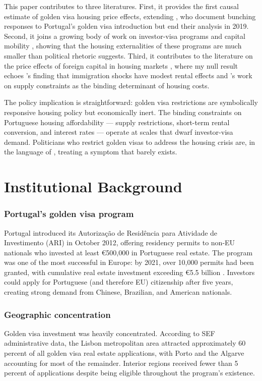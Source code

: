 \documentclass[12pt]{article}
\begin{document}
This paper contributes to three literatures. First, it provides the first causal estimate of golden visa housing price effects, extending \citet{dePereiraDosSantos2024}, who document bunching responses to Portugal's golden visa introduction but end their analysis in 2019. Second, it joins a growing body of work on investor-visa programs and capital mobility \citep{Xu2021, Surak2021}, showing that the housing externalities of these programs are much smaller than political rhetoric suggests. Third, it contributes to the literature on the price effects of foreign capital in housing markets \citep{Badarinza2017, Cvijanovic2022, Sá2017}, where my null result echoes \citet{Saiz2007}'s finding that immigration shocks have modest rental effects and \citet{Hilber2016}'s work on supply constraints as the binding determinant of housing costs.

The policy implication is straightforward: golden visa restrictions are symbolically responsive housing policy but economically inert. The binding constraints on Portuguese housing affordability --- supply restrictions, short-term rental conversion, and interest rates --- operate at scales that dwarf investor-visa demand. Politicians who restrict golden visas to address the housing crisis are, in the language of \citet{Glaeser2018}, treating a symptom that barely exists.

\section{Institutional Background}

\subsubsection*{Portugal's golden visa program} Portugal introduced its Autoriza\c{c}\~{a}o de Resid\^{e}ncia para Atividade de Investimento (ARI) in October 2012, offering residency permits to non-EU nationals who invested at least \euro500,000 in Portuguese real estate. The program was one of the most successful in Europe: by 2021, over 10,000 permits had been granted, with cumulative real estate investment exceeding \euro5.5 billion \citep{dePereiraDosSantos2024}. Investors could apply for Portuguese (and therefore EU) citizenship after five years, creating strong demand from Chinese, Brazilian, and American nationals.

\subsubsection*{Geographic concentration} Golden visa investment was heavily concentrated. According to SEF administrative data, the Lisbon metropolitan area attracted approximately 60 percent of all golden visa real estate applications, with Porto and the Algarve accounting for most of the remainder. Interior regions received fewer than 5 percent of applications despite being eligible throughout the program's existence.
\end{document}
